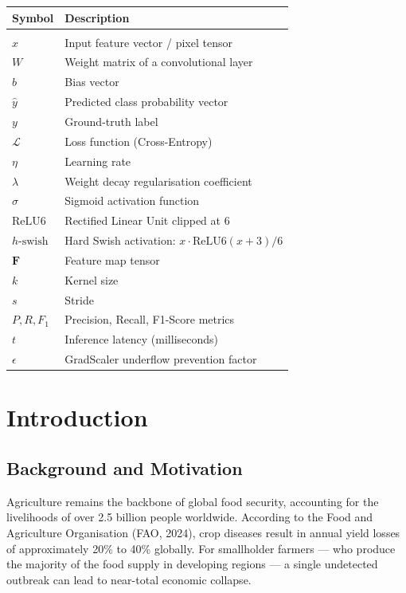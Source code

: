 \documentclass[12pt,oneside]{report}
\begin{document}
\begin{longtable}{p{3.5cm} p{10cm}}
\textbf{Symbol} & \textbf{Description} \\
\hline \\
$x$             & Input feature vector / pixel tensor \\
$W$             & Weight matrix of a convolutional layer \\
$b$             & Bias vector \\
$\hat{y}$       & Predicted class probability vector \\
$y$             & Ground-truth label \\
$\mathcal{L}$   & Loss function (Cross-Entropy) \\
$\eta$          & Learning rate \\
$\lambda$       & Weight decay regularisation coefficient \\
$\sigma$        & Sigmoid activation function \\
$\text{ReLU6}$  & Rectified Linear Unit clipped at 6 \\
$h\text{-swish}$ & Hard Swish activation: $x \cdot \text{ReLU6}(x+3)/6$ \\
$\mathbf{F}$    & Feature map tensor \\
$k$             & Kernel size \\
$s$             & Stride \\
$P, R, F_1$     & Precision, Recall, F1-Score metrics \\
$t$             & Inference latency (milliseconds) \\
$\epsilon$      & GradScaler underflow prevention factor \\
\end{longtable}
\clearpage

\setcounter{page}{1}

\chapter{Introduction}
\fontsize{12}{18}\selectfont

\section{Background and Motivation}
Agriculture remains the backbone of global food security, accounting for the livelihoods of over 2.5 billion people worldwide. According to the Food and Agriculture Organisation (FAO, 2024), crop diseases result in annual yield losses of approximately 20\% to 40\% globally. For smallholder farmers — who produce the majority of the food supply in developing regions — a single undetected outbreak can lead to near-total economic collapse.
\end{document}
